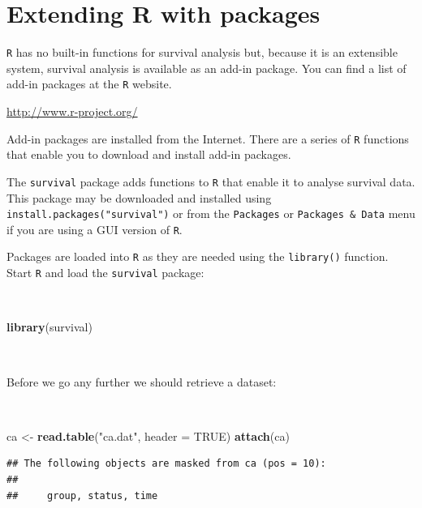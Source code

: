 \documentclass[12pt,a4paper]{book}
\newenvironment{Shaded}{\begin{snugshade}}{\end{snugshade}}
\newcommand{\DataTypeTok}[1]{\textcolor[rgb]{0.13,0.29,0.53}{#1}}
\newcommand{\KeywordTok}[1]{\textcolor[rgb]{0.13,0.29,0.53}{\textbf{#1}}}
\newcommand{\NormalTok}[1]{#1}
\newcommand{\OtherTok}[1]{\textcolor[rgb]{0.56,0.35,0.01}{#1}}
\newcommand{\StringTok}[1]{\textcolor[rgb]{0.31,0.60,0.02}{#1}}
\theoremstyle{definition}
\theoremstyle{definition}
\theoremstyle{definition}
\theoremstyle{remark}
\begin{document}
\hypertarget{exercise5}{%
\chapter{Extending R with packages}\label{exercise5}}

\texttt{R} has no built-in functions for survival analysis but, because
it is an extensible system, survival analysis is available as an add-in
package. You can find a list of add-in packages at the \texttt{R}
website.

\url{http://www.r-project.org/}

Add-in packages are installed from the Internet. There are a series of
\texttt{R} functions that enable you to download and install add-in
packages.

The \texttt{survival} package adds functions to \texttt{R} that enable
it to analyse survival data. This package may be downloaded and
installed using \texttt{install.packages("survival")} or from the
\texttt{Packages} or \texttt{Packages\ \&\ Data} menu if you are using a
GUI version of \texttt{R}.

Packages are loaded into \texttt{R} as they are needed using the
\texttt{library()} function. Start \texttt{R} and load the
\texttt{survival} package:

~

\begin{Shaded}
\begin{Highlighting}[]
\KeywordTok{library}\NormalTok{(survival)}
\end{Highlighting}
\end{Shaded}

~

Before we go any further we should retrieve a dataset:

~

\begin{Shaded}
\begin{Highlighting}[]
\NormalTok{ca <-}\StringTok{ }\KeywordTok{read.table}\NormalTok{(}\StringTok{"ca.dat"}\NormalTok{, }\DataTypeTok{header =} \OtherTok{TRUE}\NormalTok{)}
\KeywordTok{attach}\NormalTok{(ca)}
\end{Highlighting}
\end{Shaded}

\begin{verbatim}
## The following objects are masked from ca (pos = 10):
## 
##     group, status, time
\end{verbatim}

~
\end{document}
